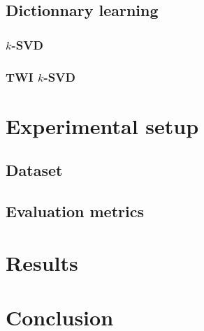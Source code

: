 \documentclass[10pt,twocolumn,letterpaper]{article}
\begin{document}
\subsection{Dictionnary learning}

\subsubsection{$k$-SVD}

\paragraph{} 

\subsubsection{TWI $k$-SVD}

\paragraph{} 


\section{Experimental setup}
\label{sec:setup}

\subsection{Dataset}

\paragraph{} 

\subsection{Evaluation metrics}

\paragraph{} 


\section{Results}
\label{sec:results}

\paragraph{} 



\section{Conclusion}
\label{sec:conclusion}

\paragraph{} 


{\small


}
\end{document}
